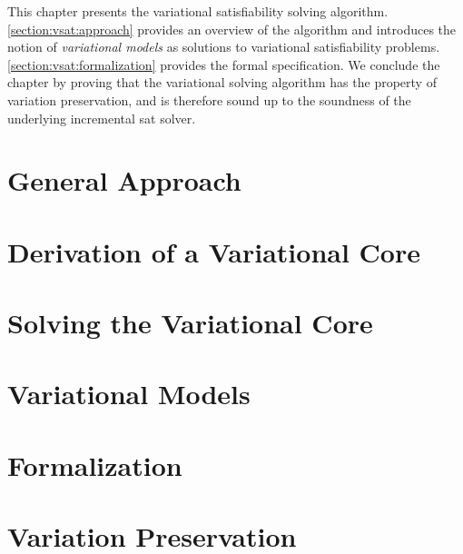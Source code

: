 \label{chapter:vsat}

This chapter presents the variational satisfiability solving algorithm.
\autoref{section:vsat:approach} provides an overview of the algorithm and
introduces the notion of \emph{variational models} as solutions to variational
satisfiability problems. \autoref{section:vsat:formalization} provides the
formal specification. We conclude the chapter by proving that the variational
solving algorithm has the property of variation preservation, and is therefore
sound up to the soundness of the underlying incremental \ac{sat} solver.

\section{General Approach}


\section{Derivation of a Variational Core}


\section{Solving the Variational Core}


\section{Variational Models}


\section{Formalization}


\section{Variation Preservation}



